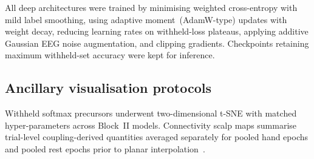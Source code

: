 All deep architectures were trained by minimising weighted cross-entropy with mild label smoothing, using adaptive moment~(AdamW-type) updates with weight decay, reducing learning rates on withheld-loss plateaus, applying additive Gaussian EEG noise augmentation, and clipping gradients.
Checkpoints retaining maximum withheld-set accuracy were kept for inference.

\subsection{Ancillary visualisation protocols}

Withheld softmax precursors underwent two-dimensional t-SNE with matched hyper-parameters across Block~II models.
Connectivity scalp maps summarise trial-level coupling-derived quantities averaged separately for pooled hand epochs and pooled rest epochs prior to planar interpolation~\cite{ofner2017upper}.
